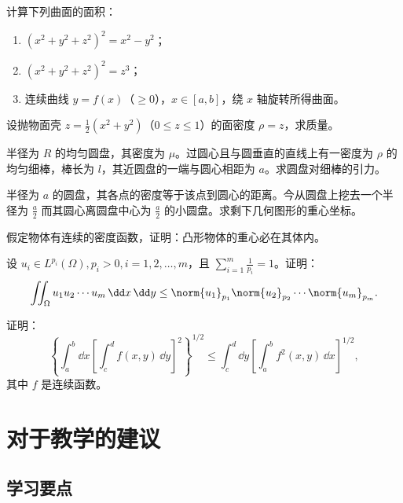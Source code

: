 \begin{xexercise}[2]
计算下列曲面的面积：
  \begin{enumerate}[label=(\arabic*)]
    \item $(x^2+y^2+z^2)^2=x^2-y^2$；
    \item $(x^2+y^2+z^2)^2=z^3$；
    \item 连续曲线 $y=f(x)$（$\ge0$），$x\in[a,b]$，绕 $x$ 轴旋转所得曲面。
  \end{enumerate}
\end{xexercise}

\begin{xexercise}[3]
设抛物面壳 $z=\frac12(x^2+y^2)$（$0\le z\le1$）的面密度 $\rho=z$，求质量。
\end{xexercise}

\begin{xexercise}[4]
半径为 $R$ 的均匀圆盘，其密度为 $\mu$。过圆心且与圆垂直的直线上有一密度为 $\rho$ 的均匀细棒，棒长为 $l$，其近圆盘的一端与圆心相距为 $a$。求圆盘对细棒的引力。
\end{xexercise}

\begin{xexercise}[5]
半径为 $a$ 的圆盘，其各点的密度等于该点到圆心的距离。今从圆盘上挖去一个半径为 $\frac a2$ 而其圆心离圆盘中心为 $\frac a2$ 的小圆盘。求剩下几何图形的重心坐标。
\end{xexercise}

\begin{xexercise}[6]
假定物体有连续的密度函数，证明：凸形物体的重心必在其体内。
\end{xexercise}

\begin{xexercise}[7]
设 $u_i\in L^{p_i}(\Omega),p_i>0,i=1,2,\ldots,m$，且 $\sum_{i=1}^m\frac1{p_i}=1$。证明：
  \[
    \iint_\Omega u_1u_2\cdots u_m\,\dd x\,\dd y
    \le\norm{u_1}_{p_1}\norm{u_2}_{p_2}\cdots\norm{u_m}_{p_m}.
  \]
\end{xexercise}

\begin{xexercise}[8]
证明：
  \[
    \left\{\int_a^b\dd x\left[\int_c^d f(x,y)\,\dd y\right]^2\right\}^{1/2}
    \le\int_c^d\dd y\left[\int_a^b f^2(x,y)\,\dd x\right]^{1/2},
  \]
  其中 $f$ 是连续函数。
\end{xexercise}

\section{对于教学的建议}

\subsection{学习要点}

